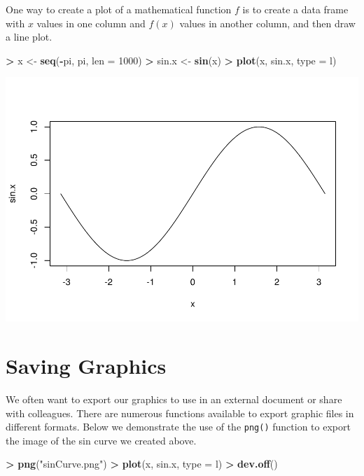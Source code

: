 \documentclass[
]{krantz}
\makeatletter
\newenvironment{Shaded}{\begin{snugshade}}{\end{snugshade}}
\newcommand{\DataTypeTok}[1]{\textcolor[rgb]{0.27,0.27,0.27}{#1}}
\newcommand{\DecValTok}[1]{\textcolor[rgb]{0.06,0.06,0.06}{#1}}
\newcommand{\KeywordTok}[1]{\textcolor[rgb]{0.27,0.27,0.27}{\textbf{#1}}}
\newcommand{\NormalTok}[1]{#1}
\newcommand{\OperatorTok}[1]{\textcolor[rgb]{0.43,0.43,0.43}{\textbf{#1}}}
\newcommand{\StringTok}[1]{\textcolor[rgb]{0.5,0.5,0.5}{#1}}
\newenvironment{kframe}{%
\medskip{}
\setlength{\fboxsep}{.8em}
 \def\at@end@of@kframe{}%
 \ifinner\ifhmode%
  \def\at@end@of@kframe{\end{minipage}}%
  \begin{minipage}{\columnwidth}%
 \fi\fi%
 \def\FrameCommand##1{\hskip\@totalleftmargin \hskip-\fboxsep
 \colorbox{shadecolor}{##1}\hskip-\fboxsep
     \hskip-\linewidth \hskip-\@totalleftmargin \hskip\columnwidth}%
 \MakeFramed {\advance\hsize-\width
   \@totalleftmargin\z@ \linewidth\hsize
   \@setminipage}}%
 {\par\unskip\endMakeFramed%
 \at@end@of@kframe}
\renewenvironment{Shaded}{\begin{kframe}}{\end{kframe}}
\makeatother
\begin{document}
One way to create a plot of a mathematical function \(f\) is to create a data frame with \(x\) values in one column and \(f(x)\) values in another column, and then draw a line plot.

\begin{Shaded}
\begin{Highlighting}[]
\OperatorTok{\textgreater{}}\StringTok{ }\NormalTok{x \textless{}{-}}\StringTok{ }\KeywordTok{seq}\NormalTok{(}\OperatorTok{{-}}\NormalTok{pi, pi, }\DataTypeTok{len =} \DecValTok{1000}\NormalTok{)}
\OperatorTok{\textgreater{}}\StringTok{ }\NormalTok{sin.x \textless{}{-}}\StringTok{ }\KeywordTok{sin}\NormalTok{(x)}
\OperatorTok{\textgreater{}}\StringTok{ }\KeywordTok{plot}\NormalTok{(x, sin.x, }\DataTypeTok{type =} \StringTok{\textquotesingle{}l\textquotesingle{}}\NormalTok{)}
\end{Highlighting}
\end{Shaded}

\includegraphics{bookdown_files/figure-latex/unnamed-chunk-362-1.pdf}

\hypertarget{saving-graphics-1}{%
\section{Saving Graphics}\label{saving-graphics-1}}

We often want to export our graphics to use in an external document or share with colleagues. There are numerous functions available to export graphic files in different formats. Below we demonstrate the use of the \texttt{png()} function to export the image of the sin curve we created above.

\begin{Shaded}
\begin{Highlighting}[]
\OperatorTok{\textgreater{}}\StringTok{ }\KeywordTok{png}\NormalTok{(}\StringTok{"sinCurve.png"}\NormalTok{)}
\OperatorTok{\textgreater{}}\StringTok{ }\KeywordTok{plot}\NormalTok{(x, sin.x, }\DataTypeTok{type =} \StringTok{\textquotesingle{}l\textquotesingle{}}\NormalTok{)}
\OperatorTok{\textgreater{}}\StringTok{ }\KeywordTok{dev.off}\NormalTok{()}
\end{Highlighting}
\end{Shaded}
\end{document}
